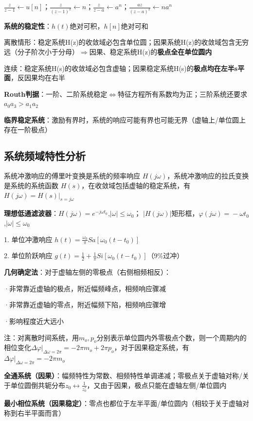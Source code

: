 $\frac{z}{z-1} \gets u[n]$；$\frac{z}{(z-1)^2}\leftarrow n$；$\frac{z}{z-a} \leftarrow a^n$；$\frac{az}{(z-a)^2}\leftarrow na^n$

\textbf{系统的稳定性}：$h(t)$绝对可积，$h[n]$绝对可和

离散情形：稳定系统H(z)的收敛域必包含单位圆；因果系统H(z)的收敛域包含无穷远（分子阶次小于分母）$\Rightarrow$因果、稳定系统H(z)的\textbf{极点全在单位圆内}

连续：稳定系统H(s)的收敛域必包含虚轴；因果稳定系统H(s)的\textbf{极点均在左半s平面}，反因果均在右半

\textbf{Routh判据}：一阶、二阶系统稳定$\Leftrightarrow$特征方程所有系数均为正；三阶系统还要求$a_0a_3>a_1a_2$

\textbf{临界稳定系统}：激励有界时，系统的响应可能有界也可能无界（虚轴上/单位圆上存在一阶极点）

\subsection*{系统频域特性分析}

系统冲激响应的傅里叶变换是系统的频率响应 $H(j\omega)$，系统冲激响应的拉氏变换是系统的系统函数 $H(s)$，在收敛域包括虚轴的稳定系统，有$H(j\omega)=H(s)|_{s=j\omega}$

\textbf{理想低通滤波器}：$H(j\omega)\!=\!e^{-j\omega t_0}$,$|\omega|\!\leq\!\omega_0$；
$|H(j\omega)|$矩形框，$\varphi(j\omega)\!=\!-\omega t_0$,$|\omega|\!\leq\!\omega_0$

1. 单位冲激响应 $h(t)=\frac{\omega_0}{\pi}Sa[\omega_0(t-t_0)]$

2. 单位阶跃响应 $g(t)=\frac{1}{2}+\frac{1}{\pi}Si[\omega_0(t-t_0)]$（9\%过冲）

\textbf{几何确定法}：对于虚轴左侧的零极点（右侧相频相反）：

·非常靠近虚轴的极点，附近幅频峰点，相频响应骤减

·非常靠近虚轴的零点，附近幅频下陷，相频响应骤增

·影响程度近大远小

注：对离散时间系统，用$m_o,p_o$分别表示单位圆内外零极点个数，则一个周期内的相位变化$\Delta\varphi|_{\Delta\omega=2\pi}=-2\pi m_o+2\pi p_o$，对于因果稳定系统，有$\Delta\varphi|_{\Delta\omega=2\pi}=-2\pi m_o$

\textbf{全通系统（因果）}：幅频特性为常数、相频特性单调递减；零极点关于虚轴对称/关于单位圆倒共轭分布$z_0\leftrightarrow\frac{1}{z_0^*}$，又由于因果，极点只能在虚轴左侧/单位圆内

\textbf{最小相位系统（因果稳定）}：零点也都位于左半平面/单位圆内（相较于关于虚轴对称到右半平面而言）

